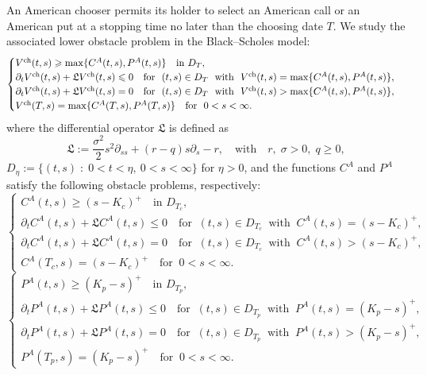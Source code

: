 \documentclass[11pt, a4paper, leqno]{amsart}
\numberwithin{equation}{section}
\theoremstyle{plain}
\theoremstyle{definition}
\theoremstyle{remark}
\def\le{\leqslant}
\def\leq{\leqslant}
\def\geq{\geqslant}
\begin{document}
{
An American chooser permits its holder to select an American call or an
American put at a stopping time no later than the choosing date $T$.
We study the associated lower obstacle problem in the Black--Scholes model:
}
\begin{equation}\label{eqV*}
    \begin{cases}
    {V^{\rm ch}(t,s)\geq\max\{C^A(t,s),P^A(t,s)\}\quad\text{in }D_T,}\\
        \partial_t V^{\rm ch}(t,s) + \mathfrak{L} V^{\rm ch}(t,s) \le 0  \quad  \text{for }\ (t,s)\in D_T\  \text{ with } \  V^{\rm ch}(t,s) = \max\{C^A(t,s),P^A(t,s)\},\\
        \partial_t V^{\rm ch}(t,s) + \mathfrak{L} V^{\rm ch}(t,s) = 0 \quad \text{for }\ (t,s)\in D_T\ \text{ with } \   V^{\rm ch}(t,s) > \max\{C^A(t,s),P^A(t,s)\},\\
        V^{\rm ch}(T,s) = \max\{C^A(T,s),P^A(T,s)\} \quad  \text{for } \ 0<s<\infty.
    \end{cases}
\end{equation}
where the differential operator $\mathfrak{L}$ is defined as
\[ \mathfrak{L}:=\frac{\sigma^2}{2}s^2\partial_{ss}+(r-q)s\partial_s-r, \quad \text{with} \quad r,\;\sigma>0,\;q\geq 0, \]
$D_\eta:=\{(t,s)\;:\; 0<t< \eta,\  0<s<\infty \}$ for $\eta>0$, and
the functions $C^A$ and $P^A$ satisfy the following obstacle problems,
respectively:
\begin{equation}\label{eqC*}
    \begin{cases}
    {C^A(t,s)\geq(s-K_c)^+\quad\text{in }D_{T_c},}\\
        \partial_t C^A (t,s) + \mathfrak{L} C^A (t,s) \le 0 \quad
         \text{for }\ (t,s)\in D_{T_c} \ \text{ with }\  C^A(t,s)=(s-K_c)^+,\\
        \partial_t C^A (t,s) + \mathfrak{L} C^A (t,s) = 0 \quad \text{for }\ (t,s)\in D_{T_c} \ \text{ with }\  C^A(t,s)>(s-K_c)^+,\\
        {C^A(T_c,s)} = (s-K_c)^+  \quad \text{for }\ 0<s<\infty.
    \end{cases}
\end{equation}
\begin{equation}\label{eqP*}
 \begin{cases}
    {P^A(t,s)\geq(K_p-s)^+\quad\text{in }D_{T_p},}\\
        \partial_t P^A (t,s) + \mathfrak{L} P^A (t,s) \le 0  \quad \text{for }\ (t,s)\in D_{T_p} \ \text{ with }\  P^A(t,s)=(K_p-s)^+,\\
        \partial_t P^A (t,s) + \mathfrak{L} P^A (t,s) = 0    \quad \text{for }\ (t,s)\in D_{T_p} \ \text{ with }\   P^A(t,s)>(K_p-s)^+,\\
        {P^A(T_p,s)} = (K_p-s)^+  \quad \text{for }\ 0<s<\infty.
    \end{cases}
\end{equation}
\end{document}
